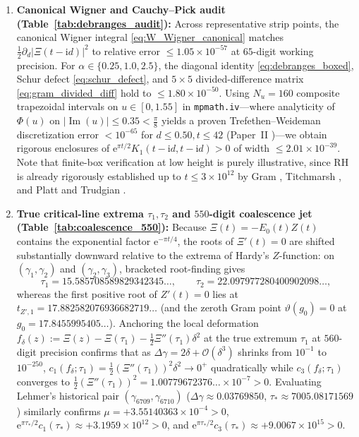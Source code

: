 \documentclass[11pt,reqno]{amsart}
\theoremstyle{definition}
\theoremstyle{remark}
\numberwithin{equation}{section}
\newcommand{\ii}{\mathrm{i}}
\newcommand{\ee}{\mathrm{e}}
\newcommand{\Ima}{\operatorname{Im}}
\begin{document}
\begin{enumerate}[label=\textup{(\arabic*)},leftmargin=2.2em]
  \item \textbf{Canonical Wigner and Cauchy--Pick audit (Table~\ref{tab:debranges_audit}):} Across representative strip points, the canonical Wigner integral \eqref{eq:W_Wigner_canonical} matches $\frac{1}{2}\partial_d\lvert\Xi(t-\ii d)\rvert^2$ to relative error $\le 1.05 \times 10^{-57}$ at $65$-digit working precision. For $\alpha \in \{0.25, 1.0, 2.5\}$, the diagonal identity \eqref{eq:debranges_boxed}, Schur defect \eqref{eq:schur_defect}, and $5\times 5$ divided-difference matrix \eqref{eq:gram_divided_diff} hold to $\le 1.80 \times 10^{-50}$. Using $N_u = 160$ composite trapezoidal intervals on $u \in [0, 1.55]$ in \texttt{mpmath.iv}---where analyticity of $\Phi(u)$ on $\lvert\Ima(u)\rvert \le 0.35 < \frac{\pi}{8}$ yields a proven Trefethen--Weideman discretization error $< 10^{-65}$ for $d \le 0.50, t \le 42$ (Paper~II \cite[Lemma~A.1(c)]{Missiaen2026Paper2})---we obtain rigorous enclosures of $\ee^{\pi t/2}K_1(t-\ii d, t-\ii d) > 0$ of width $\le 2.01 \times 10^{-39}$. Note that finite-box verification at low height is purely illustrative, since RH is already rigorously established up to $t \le 3 \times 10^{12}$ by Gram \cite{Gram1903}, Titchmarsh \cite{TitchmarshComrie1936}, and Platt and Trudgian \cite{PlattTrudgian2021}.
  \item \textbf{True critical-line extrema $\tau_1, \tau_2$ and $550$-digit coalescence jet (Table~\ref{tab:coalescence_550}):} Because $\Xi(t) = -E_0(t)Z(t)$ contains the exponential factor $\ee^{-\pi t/4}$, the roots of $\Xi'(t) = 0$ are shifted substantially downward relative to the extrema of Hardy's $Z$-function: on $(\gamma_1, \gamma_2)$ and $(\gamma_2, \gamma_3)$, bracketed root-finding gives
  \begin{equation}\label{eq:true_tau1_tau2}
    \tau_1 = 15.585708589829342345\dots, \qquad
    \tau_2 = 22.097977280400902098\dots,
  \end{equation}
  whereas the first positive root of $Z'(t) = 0$ lies at $t_{Z',1} = 17.882582076936682719\dots$ (and the zeroth Gram point $\vartheta(g_0) = 0$ at $g_0 = 17.8455995405\dots$). Anchoring the local deformation $f_\delta(z) := \Xi(z) - \Xi(\tau_1) - \frac{1}{2}\Xi''(\tau_1)\delta^2$ at the true extremum $\tau_1$ at $560$-digit precision confirms that as $\Delta\gamma = 2\delta + \mathcal{O}(\delta^3)$ shrinks from $10^{-1}$ to $10^{-250}$, $c_1(f_\delta; \tau_1) = \frac{1}{2}(\Xi''(\tau_1))^2\delta^2 \to 0^+$ quadratically while $c_3(f_\delta; \tau_1)$ converges to $\frac{1}{2}(\Xi''(\tau_1))^2 = 1.00779672376\dots \times 10^{-7} > 0$. Evaluating Lehmer's historical pair $(\gamma_{6709}, \gamma_{6710})$ ($\Delta\gamma \approx 0.03769850$, $\tau_* \approx 7005.08171569$) similarly confirms $\mu = +3.55140363 \times 10^{-4} > 0$, $\ee^{\pi\tau_*/2}c_1(\tau_*) \approx +3.1959 \times 10^{12} > 0$, and $\ee^{\pi\tau_*/2}c_3(\tau_*) \approx +9.0067 \times 10^{15} > 0$.
\end{enumerate}
\end{document}
